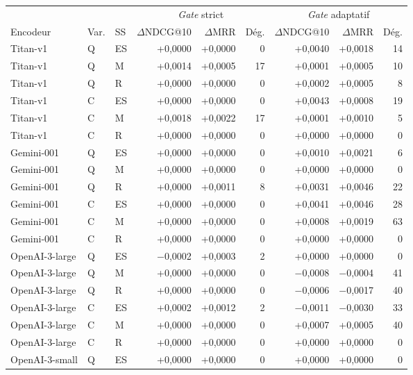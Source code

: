 \documentclass[a4paper,10pt]{article}
\begin{document}
\begin{table}[p]
\centering
\small
\begin{tabular}{lllrrrrrr}
\toprule
 & & & \multicolumn{3}{c}{\textit{Gate} strict} & \multicolumn{3}{c}{\textit{Gate} adaptatif} \\
\cmidrule(lr){4-6}\cmidrule(lr){7-9}
Encodeur & Var. & SS & $\Delta$NDCG@10 & $\Delta$MRR & Dég. & $\Delta$NDCG@10 & $\Delta$MRR & Dég. \\
\midrule
Titan-v1 & Q & ES & +0,0000 & +0,0000 & 0 & +0,0040 & +0,0018 & 14 \\
Titan-v1 & Q & M & +0,0014 & +0,0005 & 17 & +0,0001 & +0,0005 & 10 \\
Titan-v1 & Q & R & +0,0000 & +0,0000 & 0 & +0,0002 & +0,0005 & 8 \\
Titan-v1 & C & ES & +0,0000 & +0,0000 & 0 & +0,0043 & +0,0008 & 19 \\
Titan-v1 & C & M & +0,0018 & +0,0022 & 17 & +0,0001 & +0,0010 & 5 \\
Titan-v1 & C & R & +0,0000 & +0,0000 & 0 & +0,0000 & +0,0000 & 0 \\
\midrule
Gemini-001 & Q & ES & +0,0000 & +0,0000 & 0 & +0,0010 & +0,0021 & 6 \\
Gemini-001 & Q & M & +0,0000 & +0,0000 & 0 & +0,0000 & +0,0000 & 0 \\
Gemini-001 & Q & R & +0,0000 & +0,0011 & 8 & +0,0031 & +0,0046 & 22 \\
Gemini-001 & C & ES & +0,0000 & +0,0000 & 0 & +0,0041 & +0,0046 & 28 \\
Gemini-001 & C & M & +0,0000 & +0,0000 & 0 & +0,0008 & +0,0019 & 63 \\
Gemini-001 & C & R & +0,0000 & +0,0000 & 0 & +0,0000 & +0,0000 & 0 \\
\midrule
OpenAI-3-large & Q & ES & $-$0,0002 & +0,0003 & 2 & +0,0000 & +0,0000 & 0 \\
OpenAI-3-large & Q & M & +0,0000 & +0,0000 & 0 & $-$0,0008 & $-$0,0004 & 41 \\
OpenAI-3-large & Q & R & +0,0000 & +0,0000 & 0 & $-$0,0006 & $-$0,0017 & 40 \\
OpenAI-3-large & C & ES & +0,0002 & +0,0012 & 2 & $-$0,0011 & $-$0,0030 & 33 \\
OpenAI-3-large & C & M & +0,0000 & +0,0000 & 0 & +0,0007 & +0,0005 & 40 \\
OpenAI-3-large & C & R & +0,0000 & +0,0000 & 0 & +0,0000 & +0,0000 & 0 \\
\midrule
OpenAI-3-small & Q & ES & +0,0000 & +0,0000 & 0 & +0,0000 & +0,0000 & 0 \\

\end{tabular}
\end{table}
\end{document}
